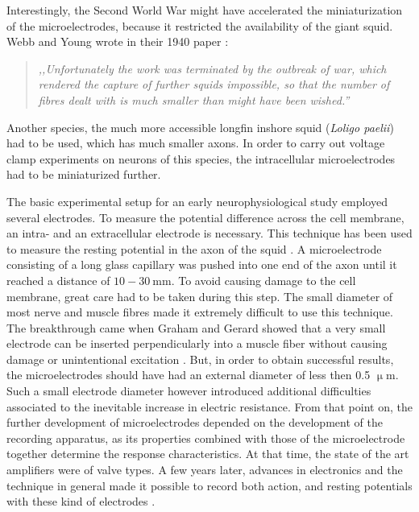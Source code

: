 Interestingly, the Second World War might have accelerated the miniaturization of the microelectrodes, because it restricted the availability of the giant squid.
Webb and Young wrote in their 1940 paper \cite{webb1940electrolyte}:

\begin{quote}
\vspace{0.5cm}
\emph{,,Unfortunately the work was terminated by the outbreak of war, which rendered the capture of further squids impossible, so that the number of fibres dealt with is much smaller than might have been wished.''}
\vspace{0.5cm}
\end{quote} 

Another species, the much more accessible longfin inshore squid (\emph{Loligo paelii}) had to be used, which has much smaller axons.
In order to carry out voltage clamp experiments on neurons of this species, the intracellular microelectrodes had to be miniaturized further.

The basic experimental setup for an early neurophysiological study employed several electrodes.
To measure the potential difference across the cell membrane, an intra- and an extracellular electrode is necessary.
This technique has been used to measure the resting potential in the axon of the squid \cite{curtis1940membrane, curtis1942membrane}.
A microelectrode consisting of a long glass capillary was pushed into one end of the axon until it reached a distance of $10-30~$mm.
To avoid causing damage to the cell membrane, great care had to be taken during this step.
The small diameter of most nerve and muscle fibres made it extremely difficult to use this technique.
The breakthrough came when Graham and Gerard showed that a very small electrode can be inserted perpendicularly into a muscle fiber without causing damage or unintentional excitation \cite{graham1946judith, ling1949normal}.
But, in order to obtain successful results, the microelectrodes should have had an external diameter of less then 0.5 $\upmu$m.
Such a small electrode diameter however introduced additional difficulties associated to the inevitable increase in electric resistance.
From that point on, the further development of microelectrodes depended on the development of the recording apparatus, as its properties combined with those of the microelectrode together determine the response characteristics.
At that time, the state of the art amplifiers were of valve types.
A few years later, advances in electronics and the technique in general made it possible to record both action, and resting potentials with these kind of electrodes \cite{hodgkin1949membrane, nastuk1950electrical}.

